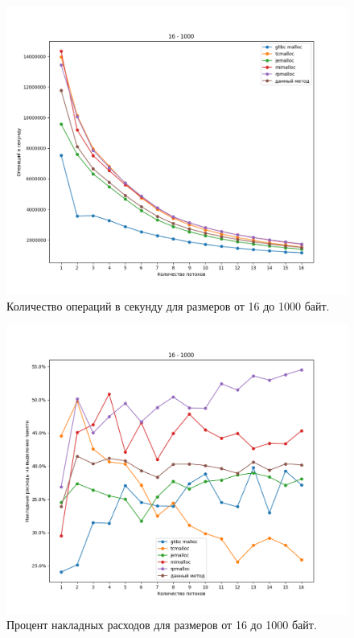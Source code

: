 \begin{figure}[!h]
	\begin{center}
		\includegraphics[width=1.0\linewidth, height=0.37\textheight]{images/16_1000_ops.png}
		\caption{Количество операций в секунду для размеров от 16 до 1000 байт.}
		\label{16_1000_ops}
	\end{center}
\end{figure}

\begin{figure}[!h]
	\begin{center}
		\includegraphics[width=1.0\linewidth, height=0.37\textheight]{images/16_1000_overhead.png}
		\caption{Процент накладных расходов для размеров от 16 до 1000 байт.}
		\label{16_1000_overhead}
	\end{center}
\end{figure}

